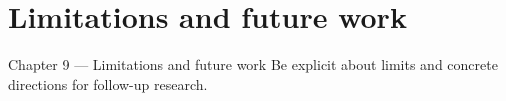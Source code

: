 \section{Limitations and future work}

\begin{frame}{Chapter 9 — Limitations and future work}
  Be explicit about limits and concrete directions for follow-up research.
\end{frame}
